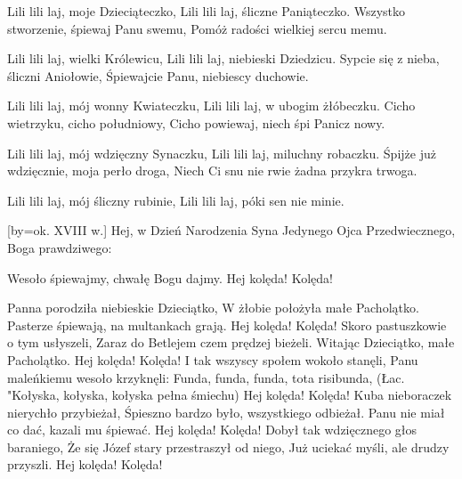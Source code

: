         Lili lili laj, moje Dzieciąteczko,
        Lili lili laj, śliczne Paniąteczko.
\endverse
\beginverse
    Wszystko stworzenie, śpiewaj Panu swemu,
    Pomóż radości wielkiej sercu memu.

        Lili lili laj, wielki Królewicu,
        Lili lili laj, niebieski Dziedzicu.
\endverse
\beginverse
    Sypcie się z nieba, śliczni Aniołowie,
    Śpiewajcie Panu, niebiescy duchowie.

        Lili lili laj, mój wonny Kwiateczku,
        Lili lili laj, w ubogim żłóbeczku.
\endverse
\beginverse
    Cicho wietrzyku, cicho południowy,
    Cicho powiewaj, niech śpi Panicz nowy.

        Lili lili laj, mój wdzięczny Synaczku,
        Lili lili laj, miluchny robaczku.
\endverse
\beginverse
    Śpijże już wdzięcznie, moja perło droga,
    Niech Ci snu nie rwie żadna przykra trwoga.

        Lili lili laj, mój śliczny rubinie,
        Lili lili laj, póki sen nie minie.
\endverse
\endsong


[by={ok. XVIII w.}]
\beginverse
    Hej, w Dzień Narodzenia Syna Jedynego
    Ojca Przedwiecznego, Boga prawdziwego:
\endverse		

\beginchorus
        Wesoło śpiewajmy, chwałę Bogu dajmy.
        Hej kolęda! Kolęda!
\endchorus

\beginverse
    Panna porodziła niebieskie Dzieciątko,
    W żłobie położyła małe Pacholątko.
\endverse		
\beginchorus
        Pasterze śpiewają, na multankach grają.
        Hej kolęda! Kolęda!	
\endchorus	
\beginverse
    Skoro pastuszkowie o tym usłyszeli,
    Zaraz do Betlejem czem prędzej bieżeli.
\endverse
\beginchorus
        Witając Dzieciątko, małe Pacholątko.
        Hej kolęda! Kolęda!
\endchorus
\beginverse
    I tak wszyscy społem wokoło stanęli,
    Panu maleńkiemu wesoło krzyknęli:
\endverse
\beginchorus
        Funda, funda, funda, tota risibunda,
        {\tiny (Łac. "Kołyska, kołyska, kołyska pełna śmiechu)}
        Hej kolęda! Kolęda!
\endchorus
\beginverse
    Kuba nieboraczek nierychło przybieżał,
    Śpieszno bardzo było, wszystkiego odbieżał.
\endverse
\beginchorus
        Panu nie miał co dać, kazali mu śpiewać.
        Hej kolęda! Kolęda!
\endchorus
\beginverse
    Dobył tak wdzięcznego głos baraniego,
    Że się Józef stary przestraszył od niego,
\endverse
\beginchorus
    Już uciekać myśli, ale drudzy przyszli.
    Hej kolęda! Kolęda!
\endchorus
\endsong




